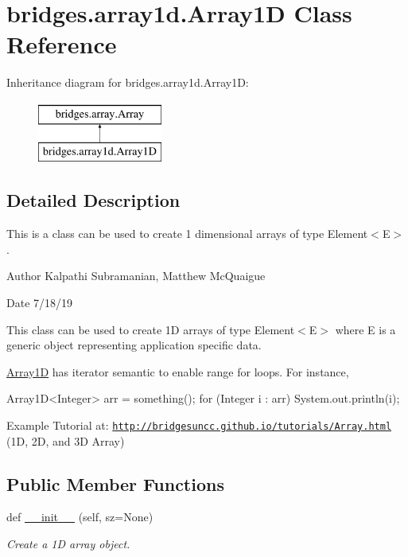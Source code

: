 \hypertarget{classbridges_1_1array1d_1_1_array1_d}{}\section{bridges.\+array1d.\+Array1D Class Reference}
\label{classbridges_1_1array1d_1_1_array1_d}
Inheritance diagram for bridges.\+array1d.\+Array1D\+:\begin{figure}[H]
\begin{center}
\leavevmode
\includegraphics[height=2.000000cm]{classbridges_1_1array1d_1_1_array1_d}
\end{center}
\end{figure}


\subsection{Detailed Description}
This is a class can be used to create 1 dimensional arrays of type Element$<$\+E$>$. 

\begin{DoxyAuthor}{Author}
Kalpathi Subramanian, Matthew Mc\+Quaigue
\end{DoxyAuthor}
\begin{DoxyDate}{Date}
7/18/19
\end{DoxyDate}
This class can be used to create 1D arrays of type Element$<$\+E$>$ where E is a generic object representing application specific data.

\hyperlink{classbridges_1_1array1d_1_1_array1_d}{Array1D} has iterator semantic to enable range for loops. For instance,


\begin{DoxyCode}
Array1D<Integer> arr = something();
\textcolor{keywordflow}{for} (Integer i : arr)
    System.out.println(i);
\end{DoxyCode}


Example Tutorial at\+: \href{http://bridgesuncc.github.io/tutorials/Array.html}{\tt http\+://bridgesuncc.\+github.\+io/tutorials/\+Array.\+html} (1D, 2D, and 3D Array)~\newline
 \subsection*{Public Member Functions}
\begin{DoxyCompactItemize}
\item 
def \hyperlink{classbridges_1_1array1d_1_1_array1_d_ac3bc432b5a53c890871a5884c08a6fa2}{\+\_\+\+\_\+init\+\_\+\+\_\+} (self, sz=None)
\begin{DoxyCompactList}\small\item\em Create a 1D array object. \end{DoxyCompactList}\end{DoxyCompactItemize}
